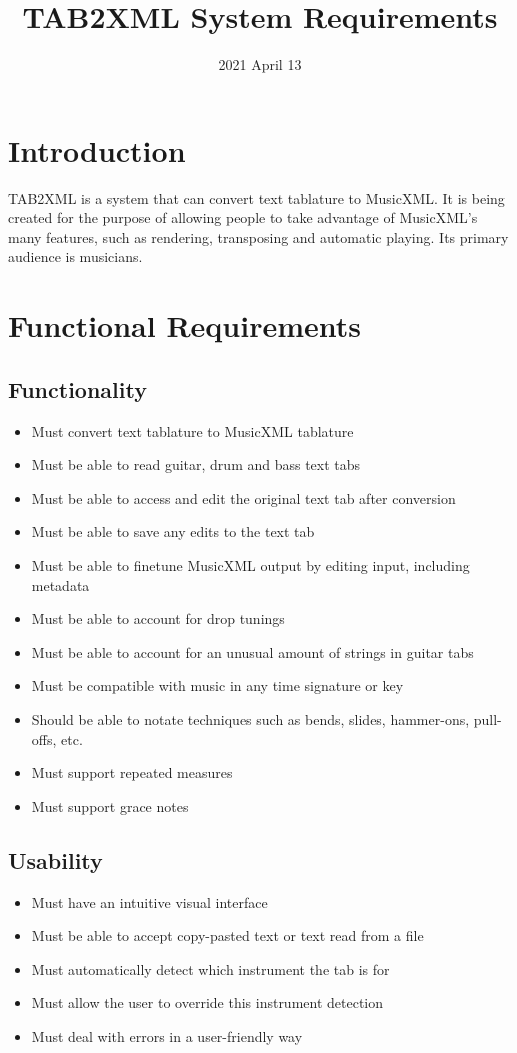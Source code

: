 \documentclass[11pt]{article}
\date{2021 April 13}
\title{TAB2XML System Requirements}
\begin{document}
\maketitle
\tableofcontents

\newpage
\section{Introduction}
\label{sec:orgc0c341d}
TAB2XML is a system that can convert text tablature to MusicXML.  It is being created for the purpose of allowing people to take advantage of MusicXML's many features, such as rendering, transposing and automatic playing.  Its primary audience is musicians.
\section{Functional Requirements}
\label{sec:org4207c9d}
\subsection{Functionality}
\label{sec:org3cbabda}
\begin{itemize}
\item Must convert text tablature to MusicXML tablature
\item Must be able to read guitar, drum and bass text tabs
\item Must be able to access and edit the original text tab after conversion
\item Must be able to save any edits to the text tab
\item Must be able to finetune MusicXML output by editing input, including metadata
\item Must be able to account for drop tunings
\item Must be able to account for an unusual amount of strings in guitar tabs
\item Must be compatible with music in any time signature or key
\item Should be able to notate techniques such as bends, slides, hammer-ons, pull-offs, etc.
\item Must support repeated measures
\item Must support grace notes
\end{itemize}
\subsection{Usability}
\label{sec:orgb95b586}
\begin{itemize}
\item Must have an intuitive visual interface
\item Must be able to accept copy-pasted text or text read from a file
\item Must automatically detect which instrument the tab is for
\item Must allow the user to override this instrument detection
\item Must deal with errors in a user-friendly way
\end{itemize}
\end{document}

